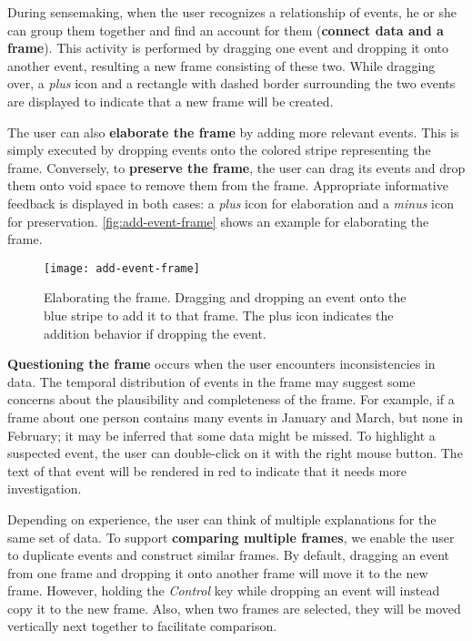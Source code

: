 During sensemaking, when the user recognizes a relationship of events, he or she can group them together and find an account for them (\textbf{connect data and a frame}). This activity is performed by dragging one event and dropping it onto another event, resulting a new frame consisting of these two. While dragging over, a \emph{plus} icon and a rectangle with dashed border surrounding the two events are displayed to indicate that a new frame will be created. 

The user can also \textbf{elaborate the frame} by adding more relevant events. This is simply executed by dropping events onto the colored stripe representing the frame. Conversely, to \textbf{preserve the frame}, the user can drag its events and drop them onto void space to remove them from the frame. Appropriate informative feedback is displayed in both cases: a \emph{plus} icon for elaboration and a \emph{minus} icon for preservation. \autoref{fig:add-event-frame} shows an example for elaborating the frame.

\begin{figure}[!htb]
	\centering
	\texttt{[image: add-event-frame]}
	\caption{Elaborating the frame. Dragging and dropping an event onto the blue stripe to add it to that frame. The plus icon indicates the addition behavior if dropping the event.}
	\label{fig:add-event-frame}
\end{figure}

\textbf{Questioning the frame} occurs when the user encounters inconsistencies in data. The temporal distribution of events in the frame may suggest some concerns about the plausibility and completeness of the frame. For example, if a frame about one person contains many events in January and March, but none in February; it may be inferred that some data might be missed. To highlight a suspected event, the user can double-click on it with the right mouse button. The text of that event will be rendered in red to indicate that it needs more investigation. 

Depending on experience, the user can think of multiple explanations for the same set of data. To support \textbf{comparing multiple frames}, we enable the user to duplicate events and construct similar frames. By default, dragging an event from one frame and dropping it onto another frame will move it to the new frame. However, holding the \emph{Control} key while dropping an event will instead copy it to the new frame. Also, when two frames are selected, they will be moved vertically next together to facilitate comparison.

